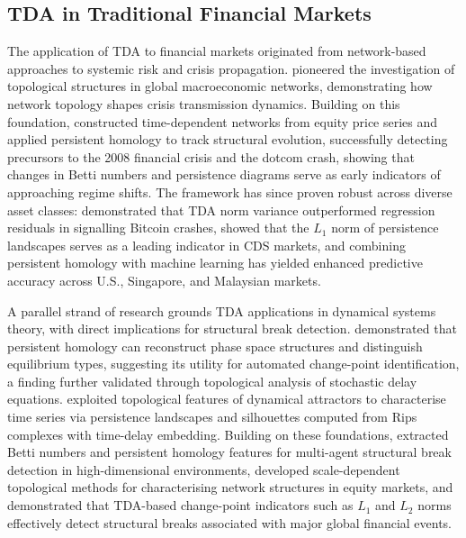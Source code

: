 \documentclass[11pt,reqno]{amsart}
\numberwithin{equation}{section} %
\begin{document}
\subsection{TDA in Traditional Financial Markets}

The application of TDA to financial markets originated from network-based approaches to systemic risk and crisis propagation. 
\citet{RN5488} pioneered the investigation of topological structures in global macroeconomic networks, demonstrating how network topology shapes crisis transmission dynamics. 
Building on this foundation, \citet{RN5643} constructed time-dependent networks from equity price series and applied persistent homology to track structural evolution, successfully detecting precursors to the 2008 financial crisis and the dotcom crash, showing that changes in Betti numbers and persistence diagrams serve as early indicators of approaching regime shifts\cite{RN5646}. 
The framework has since proven robust across diverse asset classes: \citet{RN5990} demonstrated that TDA norm variance outperformed regression residuals in signalling Bitcoin crashes, \citet{RN5859} showed that the $L_1$ norm of persistence landscapes serves as a leading indicator in CDS markets, and combining persistent homology with machine learning has yielded enhanced predictive accuracy across U.S., Singapore, and Malaysian 
markets\cite{RN6015,RN5881}.

A parallel strand of research grounds TDA applications in dynamical systems theory, with direct implications for structural break detection. 
\citet{RN5790} demonstrated that persistent homology can reconstruct phase space structures and distinguish equilibrium types, suggesting its utility for automated change-point identification, a finding further validated through topological analysis of stochastic delay equations\cite{RN5791}. \citet{RN5785} exploited topological features of dynamical attractors to characterise time series via persistence landscapes and silhouettes computed from Rips complexes with time-delay embedding\cite{RN5527,RN6282}. 
Building on these foundations, \citet{RN5438} extracted Betti numbers and persistent homology features for multi-agent structural break detection in high-dimensional environments, \citet{RN5484} developed scale-dependent topological methods for characterising network structures in equity markets, and \citet{RN3847} demonstrated that TDA-based change-point indicators such as $L_1$ and $L_2$ norms effectively detect structural breaks associated with major global financial events.
\end{document}
